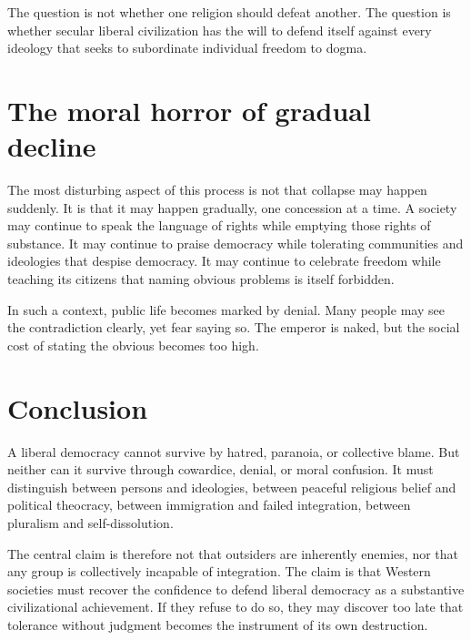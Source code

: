 \documentclass[11pt]{article}
\begin{document}
The question is not whether one religion should defeat another. The question is whether secular liberal civilization has the will to defend itself against every ideology that seeks to subordinate individual freedom to dogma.

\section{The moral horror of gradual decline}

The most disturbing aspect of this process is not that collapse may happen suddenly. It is that it may happen gradually, one concession at a time. A society may continue to speak the language of rights while emptying those rights of substance. It may continue to praise democracy while tolerating communities and ideologies that despise democracy. It may continue to celebrate freedom while teaching its citizens that naming obvious problems is itself forbidden.

In such a context, public life becomes marked by denial. Many people may see the contradiction clearly, yet fear saying so. The emperor is naked, but the social cost of stating the obvious becomes too high.

\section{Conclusion}

A liberal democracy cannot survive by hatred, paranoia, or collective blame. But neither can it survive through cowardice, denial, or moral confusion. It must distinguish between persons and ideologies, between peaceful religious belief and political theocracy, between immigration and failed integration, between pluralism and self-dissolution.

The central claim is therefore not that outsiders are inherently enemies, nor that any group is collectively incapable of integration. The claim is that Western societies must recover the confidence to defend liberal democracy as a substantive civilizational achievement. If they refuse to do so, they may discover too late that tolerance without judgment becomes the instrument of its own destruction.
\end{document}
